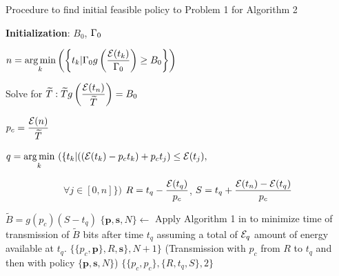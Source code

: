 \begin{algorithm}
\caption{Procedure to find initial feasible policy to Problem 1 for Algorithm 2}

\footnotesize%
\label{init_policy}
\begin{algorithmic}[1]
\State \textbf{Initialization}: $B_0$, $\Gamma_0$

\State $n=\displaystyle \operatorname*{arg\,min}_k\left(\left\{t_k | \Gamma_0 g\left(\frac{\mathcal{E}(t_k)}{\Gamma_0}\right)\geq B_0\right\}\right)$ \label{init_policy_Etn}

\State Solve for $\widetilde{T}: \widetilde{T}g\left(\dfrac{\mathcal{E}(t_n)}{\widetilde{T}}\right) = B_0$\label{init_policy_CP_time}

\State $p_c=\dfrac{\mathcal{E}(n)}{\widetilde{T}}$

\State $q=\displaystyle \operatorname*{arg\,min}_k\ ( \{ t_k | ((\mathcal{E}(t_k) - p_ct_k) + p_ct_j) \leq \mathcal{E}(t_j),$

$			 						\qquad \qquad \qquad \forall j\in[0,n]  \} )$
\label{init_policy_t_q}
\State $R=t_q-\dfrac{\mathcal{E}(t_q)}{p_c}$, $S=t_q+\dfrac{\mathcal{E}(t_n)-\mathcal{E}(t_q)}{p_c}$

	\State $\widetilde{B}=g(p_c)(S-t_q)$\label{init_policy_bits_t_q}  
	\State $\{\textbf{p},\textbf{s},N\}\gets$  Apply Algorithm 1 in \cite{Yang} to 	minimize time of
		\Statex   transmission of $\widetilde{B}$ bits  after time $t_q$ assuming	a  total of $\mathcal{E}_{q}$   
		\Statex amount of energy available at $t_q$. 
	\State\Return $\{\{p_c,\textbf{p}\},R,\textbf{s}\},N+1\}$ \label{init_policy_Yang}
	 	\Statex (Transmission with $p_c$ from $R$ to $t_q$ and then with
	 	\Statex policy $\{\textbf{p},\textbf{s},N\}$)
\Else 
	\State\Return $\{\{p_c,p_c\},\{R,t_q,S\},2\}$ \label{init_policy_CP}
\EndIf
\EndProcedure
\end{algorithmic}
\end{algorithm}



